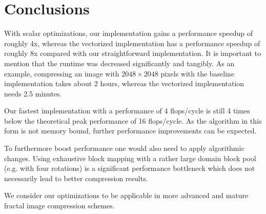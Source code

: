 \section{Conclusions}

With scalar optimizations, our implementation gains a performance speedup of
roughly 4x, whereas the vectorized implementation has a performance speedup of
roughly 8x compared with our straightforward implementation. It is important to
mention that the runtime was decreased significantly and tangibly. As an
example, compressing an image with $2048 \times 2048$ pixels with the baseline
implementation takes about 2 hours, whereas the vectorized implementation needs
2.5 minutes.

Our fastest implementation with a performance of 4 flops/cycle is still 4 times
below the theoretical peak performance of 16 flops/cycle. As the algorithm in
this form is not memory bound, further performance improvements can be expected.

To furthermore boost performance one would also need to apply algorithmic
changes. Using exhaustive block mapping with a rather large domain block pool
(e.g. with four rotations) is a significant performance bottleneck which does
not necessarily lead to better compression results.

We consider our optimizations to be applicable in more advanced and mature
fractal image compression schemes.
